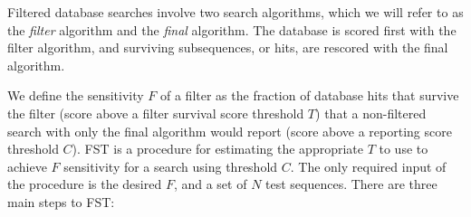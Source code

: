 Filtered database searches involve two search algorithms, which we
will refer to as the \emph{filter} algorithm and the \emph{final}
algorithm. The database is scored first with the filter algorithm,
and surviving subsequences, or hits, are rescored with the final algorithm.
\begin{comment}
Filtered database searches involve (at least) two search algorithms,
which we will refer to as the \emph{filter} algorithm and the
\emph{final} algorithm. The database is searched first with the filter
algorithm, and surviving subsequences are searched with the final
algorithm.

\begin{description}
\item[$C$: final reporting score threshold] the minimum score of a
  database subsequence that will be reported by the final search
  algorithm as a plausible hit.
\item[$T$: filter survival score threshold] the minimum score required
  of a database subsequence to survive the filter, and subsequently be
  searched with the final search algorithm.
\item[$F$: filter sensitivity] the fraction of database subsequences that
  score above $C$ using the final search method and also score above
  $T$ using the filter.
\end{comment}
We define the sensitivity $F$ of a filter as the fraction of database
hits that survive the filter (score above a filter survival score
threshold $T$) that a non-filtered search with only the final algorithm
would report (score above a reporting score threshold $C$).  FST is a
procedure for estimating the appropriate 
$T$ to use to achieve $F$ sensitivity for a search using threshold
$C$. The only required input of the procedure is the desired $F$, and
a set of $N$ test sequences. There are three main steps to FST:

